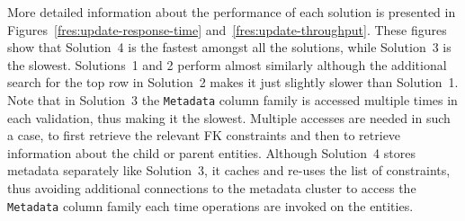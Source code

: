 
% 


More detailed information about the performance of each solution is presented in
Figures~\ref{fres:update-response-time} and~\ref{fres:update-throughput}.
These figures show that Solution~4 is the fastest amongst all the solutions,
while Solution~3 is the slowest.
Solutions~1 and 2 perform almost similarly although the additional search for
the top row in Solution~2 makes it just slightly slower than Solution~1.
Note that in Solution~3 the \texttt{Metadata} column family is accessed multiple
times in each validation, thus making it the slowest.  Multiple accesses are
needed in such a case, to first retrieve the relevant \ac{FK} constraints and
then to retrieve information about the child or parent entities.  Although
Solution~4 stores metadata separately like Solution~3,  it caches and re-uses
the list of constraints, thus avoiding additional connections to the metadata
 cluster to access the \texttt{Metadata} column family each time  operations
are invoked on  the entities.

